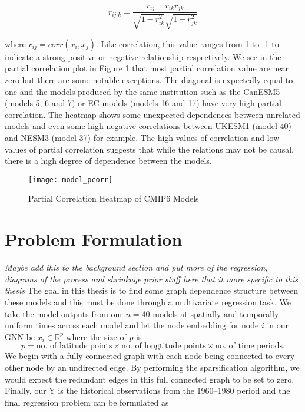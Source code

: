 \documentclass[honours,12pt]{unswthesis}
\newcommand{\R}{\mathbb{R}}
\numberwithin{equation}{section}
\begin{document}
\begin{equation}
    r_{ij|k} = \frac{r_{ij} - r_{ik}r_{jk}}{\sqrt{1-r^2_{ik}} \sqrt{1-r^2_{jk}}}
\end{equation}

{\noindent}where $r_{ij} = corr(x_i, x_j)$. Like correlation, this value ranges from 1 to -1 to indicate a strong positive or negative relationship respectively.
We see in the partial correlation plot in Figure \ref{fig:pcorr_plot} that most partial correlation value are near zero but there are some notable exceptions.
The diagonal is expectedly equal to one and the models produced by the same institution such as the CanESM5 (models 5, 6 and 7) or EC models (models 16 and 17) have very high partial correlation.
The heatmap shows some unexpected dependences between unrelated models and even some high negative correlations between UKESM1 (model 40) and NESM3 (model 37) for example.
The high values of correlation and low values of partial correlation suggests that while the relations may not be causal, there is a high degree of dependence between the models.

\begin{figure}[H]
    \centering
    \texttt{[image: model\_pcorr]}
    \caption{Partial Correlation Heatmap of CMIP6 Models}
\label{fig:pcorr_plot}
\end{figure}


{\section{Problem Formulation}}\label{problem-formulation}
\textit{Maybe add this to the background section and put more of the regression, diagrams of the process and shrinkage prior stuff here that it more specific to this thesis}
{\noindent}The goal in this thesis is to find some graph dependence structure between these models and this must be done through a multivariate regression task.
We take the model outputs from our $n = 40$ models at spatially and temporally uniform times across each model and let the node embedding for node $i$ in our GNN be $x_i \in \R^{p}$ 
where the size of $p$ is \[p = \text{no. of latitude points} \times \text{no. of longtitude points} \times \text{no. of time periods}.\]
We begin with a fully connected graph with each node being connected to every other node by an undirected edge.
By performing the sparsification algorithm, we would expect the redundant edges in this full connected graph to be set to zero. 
Finally, our Y is the historical observations from the 1960--1980 period and the final regression problem can be formulated as
\end{document}

